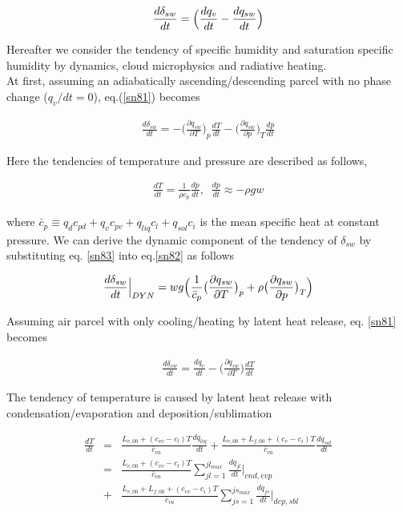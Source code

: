 \begin{eqnarray}
\frac{d \delta_{sw}}{dt}=\Bigl(\frac{dq_{v}}{dt}-\frac{dq_{sw}}{dt}\Bigr)\label{sn81}
\end{eqnarray}

Hereafter we consider the tendency of specific humidity and saturation specific humidity by dynamics, cloud microphysics and radiative heating.\\
At first, assuming an adiabatically ascending/descending parcel with no phase change ($q_{v}/dt = 0$), eq.(\ref{sn81}) becomes

\begin{eqnarray}
\frac{d\delta_{sw}}{dt}=-\bigl(\frac{\partial q_{sw}}{\partial T}\bigr)_{p}\frac{dT}{dt}-\bigl(\frac{\partial q_{sw}}{\partial p}\bigr)_{T}\frac{dp}{dt}\label{sn82}
\end{eqnarray}

Here the tendencies of temperature and pressure are described as follows,

\begin{eqnarray}
\frac{dT}{dt}=\frac{1}{\rho\bar{c}_{p}}\frac{dp}{dt},\;\;\frac{dp}{dt}\approx-\rho g w\label{sn83}
\end{eqnarray}

where $\bar{c}_{p}\equiv q_{d}c_{pd}+q_{v}c_{pv}+q_{liq}c_{l}+q_{sol}c_{i}$ is the mean specific heat at constant pressure. We can derive the dynamic component of the tendency of $\delta_{sw}$ by substituting eq. \ref{sn83} into eq.\ref{sn82} as follows

\begin{eqnarray}
\frac{d\delta_{sw}}{dt}\Bigr|_{DYN}=wg\Bigl(\frac{1}{\bar{c}_{p}}\bigl(\frac{\partial q_{sw}}{\partial T}\bigr)_{p}+\rho\bigl(\frac{\partial q_{sw}}{\partial p}\bigr)_{T}\Bigr)\label{sn84}
\end{eqnarray}

Assuming air parcel with only cooling/heating by latent heat release, eq. \ref{sn81} becomes

\begin{eqnarray}
\frac{d\delta_{sw}}{dt}=\frac{dq_{v}}{dt}-\bigl(\frac{\partial q_{sw}}{\partial T}\bigr)\frac{dT}{dt}\label{sn85}
\end{eqnarray}

The tendency of temperature is caused by latent heat release with condensation/evaporation and deposition/sublimation %

\begin{eqnarray}
\frac{dT}{dt}&=&\frac{L_{v,00}+(c_{vv}-c_{l})T}{\bar{c}_{va}}\frac{dq_{liq}}{dt}+\frac{L_{v,00}+L_{f,00}+(c_{v}-c_{i})T}{\bar{c}_{va}}\frac{dq_{sol}}{dt}\nonumber\\
&=&\frac{L_{v,00}+(c_{vv}-c_{l}) T}{\bar{c}_{va}} \sum^{jl_{max}}_{jl=1}\frac{dq_{jl}}{dt}\Bigr|_{cnd,evp}\nonumber\\
&+&\frac{L_{v,00}+L_{f,00}+(c_{vv}-c_{i})T}{\bar{c}_{va}}\sum^{js_{max}}_{js=1}\frac{dq_{js}}{dt}\Bigr|_{dep,sbl}\label{sn86}
\end{eqnarray}

